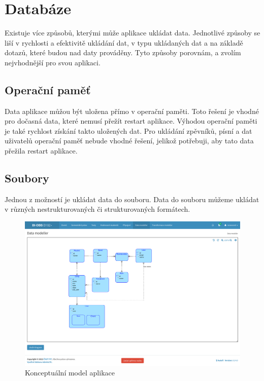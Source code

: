 \section{Databáze}

Existuje více způsobů, kterými může aplikace ukládat data. Jednotlivé způsoby se liší v rychlosti a efektivitě ukládání dat, v typu ukládaných dat a na základě dotazů, které budou nad daty prováděny. Tyto způsoby porovnám, a zvolím nejvhodnější pro svou aplikaci.

\subsection{Operační paměť}

Data aplikace můžou být uložena přímo v operační paměti. Toto řešení je vhodné pro dočasná data, které nemusí přežít restart aplikace. Výhodou operační paměti je také rychlost získání takto uložených dat. Pro ukládání zpěvníků, písní a dat uživatelů operační paměť nebude vhodné řešení, jelikož potřebuji, aby tato data přežila restart aplikace.

\subsection{Soubory}

Jednou z možností je ukládat data do souboru. Data do souboru můžeme ukládat v různých nestrukturovaných či strukturovaných formátech.

\begin{figure}[H]
    \includegraphics[width=\textwidth]{images/3-navrh/3-5-konceptualni-model.pdf}
    \caption{Konceptuální model aplikace}
\end{figure}

